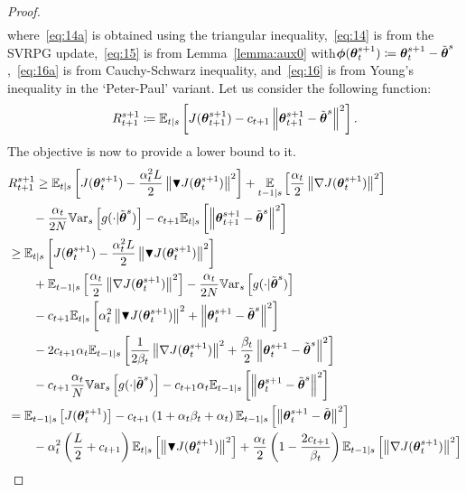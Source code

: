 \begin{proof}
\begin{align}
	\end{align}
	\endgroup
	where~\eqref{eq:14a} is obtained using the triangular inequality,~\eqref{eq:14} is from the \acs{SVRPG} update,~\eqref{eq:15} is from Lemma~\ref{lemma:aux0} with\newline $\vphi(\vtheta_t^{s+1})\coloneqq\vtheta_t^{s+1}-\tilde{\vtheta}^s$,~\eqref{eq:16a} is from Cauchy-Schwarz inequality, and~\eqref{eq:16} is from Young's inequality in the `Peter-Paul' variant.
	Let us consider the following function:
	\begin{equation}\label{E:lyapunov.function}
	R_{t+1}^{s+1} \coloneqq \Ets{J(\vtheta_{t+1}^{s+1}) - c_{t+1}\norm[]{\vtheta_{t+1}^{s+1}-\tilde{\vtheta}^s}^2}. 
	\end{equation}
	The objective is now to provide a lower bound to it.
	\begingroup
	\allowdisplaybreaks
	\begin{align}
	&R_{t+1}^{s+1} 
	\geq	\Ets{J(\vtheta_t^{s+1}) - \frac{\alpha_t^2L}{2}\norm[]{\gradBlack{\vtheta_t^{s+1}}}^2}
	+ \EVV[t-1|s]{\frac{\alpha_t}{2}\norm[]{\gradJ{\vtheta_t^{s+1}}}^2}
	\nonumber\\
	&\qquad-
	\frac{\alpha_t}{2N}\Vars{g(\cdot\vert\tilde{\vtheta}^s)}
	-c_{t+1}\Ets{\norm[]{\vtheta_{t+1}^{s+1}-\tilde{\vtheta}^s}^2} \label{eq:17}\\
	&\geq \Ets{J(\vtheta_t^{s+1}) - \frac{\alpha_t^2L}{2}\norm[]{\gradBlack{\vtheta_t^{s+1}}}^2}\\
	&\qquad+ \Ets[t-1]{\frac{\alpha_t}{2}\norm[]{\gradJ{\vtheta_t^{s+1}}}^2 }
	-\frac{\alpha_t}{2N}\Vars{g(\cdot\vert\tilde{\vtheta}^s)} \nonumber\\
	&\qquad -c_{t+1}\Ets{\alpha_t^2\norm[]{\gradBlack{\vtheta_t^{s+1}}}^2+\norm[]{\vtheta_t^{s+1}-\tilde{\vtheta}^s}^2}
	\nonumber\\
	&\qquad-2c_{t+1}\alpha_t\Ets[t-1]{\frac{1}{2\beta_t}\norm[]{\gradJ{\vtheta_t^{s+1}}}^2+\frac{\beta_t}{2}\norm[]{\vtheta_t^{s+1}-\tilde{\vtheta}^s}^2} \nonumber\\ 
	&\qquad
	-c_{t+1}\frac{\alpha_t}{N}\Vars{g(\cdot\vert\tilde{\vtheta}^s)} -c_{t+1}\alpha_t\Ets[t-1]{\norm[]{\vtheta_t^{s+1}-\tilde{\vtheta}^s}^2} \label{eq:18}\\
	&= \Ets[t-1]{J(\vtheta_t^{s+1})} - c_{t+1}\left(1+\alpha_t\beta_t+\alpha_t\right)\Ets[t-1]{\norm[]{\vtheta_{t}^{s+1}-\tilde{\vtheta}}^2} \nonumber\\
	&\qquad-\alpha_t^2\left(\frac{L}{2}+c_{t+1}\right)\Ets{\norm[]{\gradBlack{\vtheta_t^{s+1}}}^2} +\frac{\alpha_t}{2}\left(1-\frac{2c_{t+1}}{\beta_t}\right)\Ets[t-1]{\norm[]{\gradJ{\vtheta_t^{s+1}}}^2} \nonumber\\

\end{align}
\end{proof}
